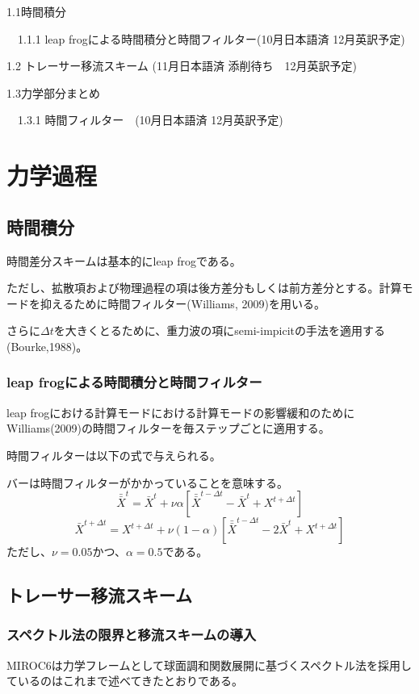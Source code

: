 \documentclass{jsbook}
\begin{document}
1.1時間積分

　1.1.1 leap frogによる時間積分と時間フィルター(10月日本語済 12月英訳予定)

1.2 トレーサー移流スキーム (11月日本語済 添削待ち　12月英訳予定)

1.3力学部分まとめ

　1.3.1 時間フィルター　(10月日本語済 12月英訳予定)
\chapter{力学過程}
\section{時間積分}
時間差分スキームは基本的にleap frogである。

ただし、拡散項および物理過程の項は後方差分もしくは前方差分とする。計算モードを抑えるために時間フィルター(Williams, 2009)を用いる。

さらに$\Delta t$を大きくとるために、重力波の項にsemi-impicitの手法を適用する(Bourke,1988)。
\subsection{leap frogによる時間積分と時間フィルター}
leap frogにおける計算モードにおける計算モードの影響緩和のためにWilliams(2009)の時間フィルターを毎ステップごとに適用する。

時間フィルターは以下の式で与えられる。

バーは時間フィルターがかかっていることを意味する。
\begin{equation}   
\bar{\bar{X}}^{t} = \bar{X}^{t} + \nu \alpha [\bar{\bar{X}}^{t-\Delta t} - \bar{X}^{t} + X^{t+\Delta t}] 
\end{equation}
\begin{equation}   
\bar{X}^{t+\Delta t} = X^{t+\Delta t} + \nu (1-\alpha) [\bar{\bar{X}}^{t-\Delta t} - 2 \bar{X}^{t} + X^{t+\Delta t}] 
\end{equation}
ただし、$\nu=0.05$かつ、$\alpha=0.5$である。
\section{トレーサー移流スキーム}
\subsection{スペクトル法の限界と移流スキームの導入}
MIROC6は力学フレームとして球面調和関数展開に基づくスペクトル法を採用しているのはこれまで述べてきたとおりである。
\end{document}
